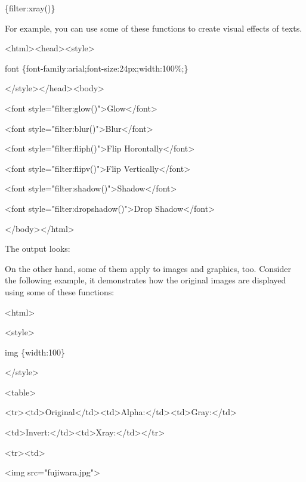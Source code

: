 \documentclass[
]{article}
\begin{document}
\{filter:xray()\}

For example, you can use some of these functions to create visual
effects of texts.

\textless html\textgreater\textless head\textgreater\textless style\textgreater{}

font \{font-family:arial;font-size:24px;width:100\%;\}

\textless/style\textgreater\textless/head\textgreater\textless body\textgreater{}

\textless font
style="filter:glow()"\textgreater Glow\textless/font\textgreater{}

\textless font
style="filter:blur()"\textgreater Blur\textless/font\textgreater{}

\textless font style="filter:fliph()"\textgreater Flip
Horontally\textless/font\textgreater{}

\textless font style="filter:flipv()"\textgreater Flip
Vertically\textless/font\textgreater{}

\textless font
style="filter:shadow()"\textgreater Shadow\textless/font\textgreater{}

\textless font style="filter:dropshadow()"\textgreater Drop
Shadow\textless/font\textgreater{}

\textless/body\textgreater\textless/html\textgreater{}

The output looks:

On the other hand, some of them apply to images and graphics, too.
Consider the following example, it demonstrates how the original images
are displayed using some of these functions:

\textless html\textgreater{}

\textless style\textgreater{}

img \{width:100\}

\textless/style\textgreater{}

\textless table\textgreater{}

\textless tr\textgreater\textless td\textgreater Original\textless/td\textgreater\textless td\textgreater Alpha:\textless/td\textgreater\textless td\textgreater Gray:\textless/td\textgreater{}

\textless td\textgreater Invert:\textless/td\textgreater\textless td\textgreater Xray:\textless/td\textgreater\textless/tr\textgreater{}

\textless tr\textgreater\textless td\textgreater{}

\textless img src="fujiwara.jpg"\textgreater{}
\end{document}
